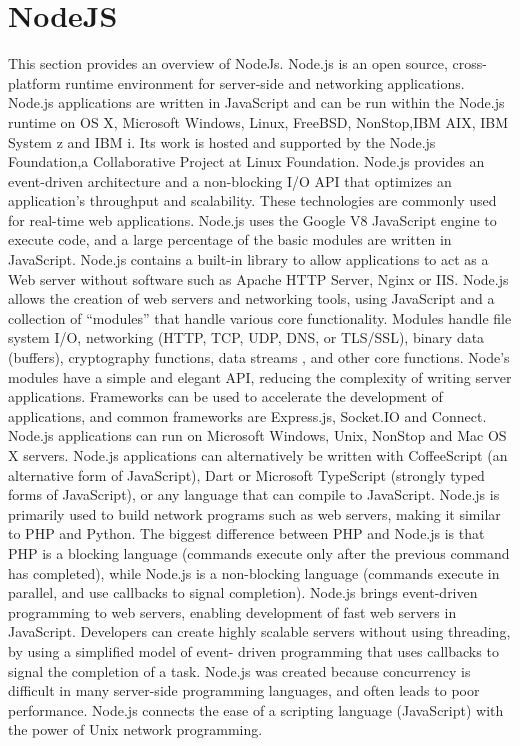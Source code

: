 \section{NodeJS}
\label{sec:nodejs}
This section provides an overview of NodeJs.
\newline
Node.js is an open source, cross-platform runtime environment for server-side and networking applications. Node.js applications are written in JavaScript and can be run within the Node.js runtime on OS X, Microsoft Windows, Linux, FreeBSD, NonStop,IBM AIX, IBM System z and IBM i. Its work is hosted and supported by the Node.js Foundation,a Collaborative Project at Linux Foundation.
\newline
Node.js provides an event-driven architecture and a non-blocking I/O API that optimizes an application’s throughput and scalability. These technologies are commonly used for real-time web applications.
\newline
Node.js uses the Google V8 JavaScript engine to execute code, and a large percentage of the basic modules are written in JavaScript. Node.js contains a built-in library to allow applications to act as a Web server without software such as Apache HTTP Server, Nginx or IIS.
\newline
Node.js allows the creation of web servers and networking tools, using JavaScript and a collection of “modules” that handle various core functionality. Modules handle file system I/O, networking (HTTP, TCP, UDP, DNS, or TLS/SSL), binary data (buffers), cryptography functions, data streams , and other core functions. Node’s modules have a simple and elegant API, reducing the complexity of writing server applications.
Frameworks can be used to accelerate the development of applications, and common frameworks are Express.js, Socket.IO and Connect. Node.js applications can run on Microsoft Windows, Unix, NonStop and Mac OS X servers. Node.js applications can alternatively be written with CoffeeScript (an alternative form of JavaScript), Dart or Microsoft TypeScript (strongly typed forms of JavaScript), or any language that can compile to JavaScript.
Node.js is primarily used to build network programs such as web servers, making it similar to PHP and Python. The biggest difference between PHP and Node.js is that PHP is a blocking language (commands execute only after the previous command has completed), while Node.js is a non-blocking language (commands execute in parallel, and use callbacks to signal completion).
\newline
Node.js brings event-driven programming to web servers, enabling development of fast web servers in JavaScript. Developers can create highly scalable servers without using threading, by using a simplified model of event- driven programming that uses callbacks to signal the completion of a task. Node.js was created because concurrency is difficult in many server-side programming languages, and often leads to poor performance. Node.js connects the ease of a scripting language (JavaScript) with the power of Unix network programming.
